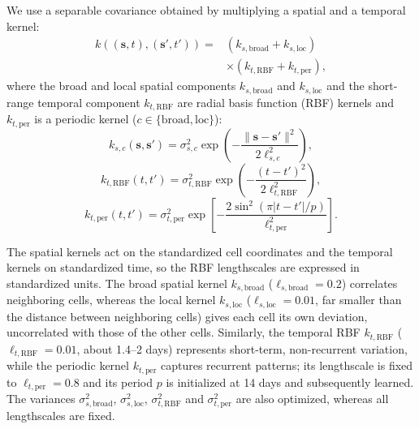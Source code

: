 We use a separable covariance obtained by multiplying a spatial and a temporal kernel:
\begin{equation}
\begin{split}
    k\!\left((\mathbf{s},t),(\mathbf{s}',t')\right)
    ={}& \left(k_{s,\mathrm{broad}}+k_{s,\mathrm{loc}}\right)\\
    &\times\left(k_{t,\mathrm{RBF}}+k_{t,\mathrm{per}}\right),
\end{split}
\label{eq:kernel}
\end{equation}
where the broad and local spatial components $k_{s,\mathrm{broad}}$ and $k_{s,\mathrm{loc}}$ and the short-range temporal component $k_{t,\mathrm{RBF}}$ are radial basis function (RBF) kernels and $k_{t,\mathrm{per}}$ is a periodic kernel ($c\in\{\mathrm{broad},\mathrm{loc}\}$):
\begin{equation}
    k_{s,c}(\mathbf{s},\mathbf{s}') = \sigma^2_{s,c}\exp\!\left(-\frac{\|\mathbf{s}-\mathbf{s}'\|^2}{2\ell_{s,c}^2}\right),
\end{equation}
\begin{equation}
    k_{t,\mathrm{RBF}}(t,t') = \sigma^2_{t,\mathrm{RBF}}\exp\!\left(-\frac{(t-t')^2}{2\ell_{t,\mathrm{RBF}}^2}\right),
\end{equation}
\begin{equation}
    k_{t,\mathrm{per}}(t,t') = \sigma^2_{t,\mathrm{per}}\exp\!\left[-\frac{2\sin^2\!\left(\pi|t-t'|/p\right)}{\ell_{t,\mathrm{per}}^2}\right].
\end{equation}

The spatial kernels act on the standardized cell coordinates and the temporal kernels on standardized time, so the RBF lengthscales are expressed in standardized units. The broad spatial kernel $k_{s,\mathrm{broad}}$ ($\ell_{s,\mathrm{broad}}=0.2$) correlates neighboring cells, whereas the local kernel $k_{s,\mathrm{loc}}$ ($\ell_{s,\mathrm{loc}}=0.01$, far smaller than the distance between neighboring cells) gives each cell its own deviation, uncorrelated with those of the other cells.
Similarly, the temporal RBF $k_{t,\mathrm{RBF}}$ ($\ell_{t,\mathrm{RBF}}=0.01$, about 1.4--2 days) represents short-term, non-recurrent variation, while the periodic kernel $k_{t,\mathrm{per}}$ captures recurrent patterns; its lengthscale is fixed to $\ell_{t,\mathrm{per}}=0.8$ and its period $p$ is initialized at 14 days and subsequently learned.
The variances $\sigma^2_{s,\mathrm{broad}}$, $\sigma^2_{s,\mathrm{loc}}$, $\sigma^2_{t,\mathrm{RBF}}$ and $\sigma^2_{t,\mathrm{per}}$ are also optimized, whereas all lengthscales are fixed.
